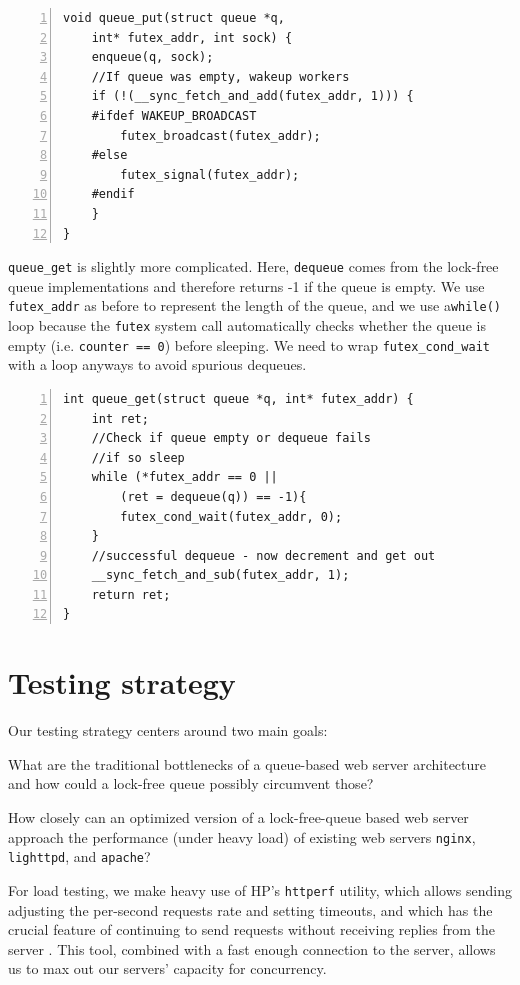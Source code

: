 \documentclass[twoside,10pt]{article}
\begin{document}
\begin{multicols}{2}
\begin{Verbatim}[numbers=left, fontsize=\small]
void queue_put(struct queue *q, 
    int* futex_addr, int sock) {
    enqueue(q, sock); 	
    //If queue was empty, wakeup workers 
    if (!(__sync_fetch_and_add(futex_addr, 1))) {
    #ifdef WAKEUP_BROADCAST
        futex_broadcast(futex_addr); 
    #else 
        futex_signal(futex_addr); 
    #endif 
    }
}
\end{Verbatim}

\verb+queue_get+ is slightly more complicated. Here, \verb+dequeue+
comes from the lock-free queue implementations and therefore returns -1 if the
queue is empty. We use \verb+futex_addr+ as before to represent the length of the queue, and we use a\verb+while()+ loop
because the \verb+futex+ system call automatically checks whether the
queue is empty (i.e.  \verb+counter == 0+) before sleeping. We need to
wrap \verb+futex_cond_wait+ with a loop anyways to avoid spurious dequeues.


\begin{Verbatim}[numbers=left,
                 fontsize=\small]
int queue_get(struct queue *q, int* futex_addr) {
    int ret;
    //Check if queue empty or dequeue fails
    //if so sleep  
    while (*futex_addr == 0 || 
        (ret = dequeue(q)) == -1){
        futex_cond_wait(futex_addr, 0);
    }
    //successful dequeue - now decrement and get out 
    __sync_fetch_and_sub(futex_addr, 1);
    return ret; 
}
\end{Verbatim}

\section{Testing strategy}

Our testing strategy centers around two main goals:

\begin{compactitem}
\item What are the traditional bottlenecks of a queue-based web server
  architecture and how could a lock-free queue possibly circumvent
  those?
\item How closely can an optimized version of a lock-free-queue based
  web server approach the performance (under heavy load) of existing
  web servers \verb+nginx+, \verb+lighttpd+, and \verb+apache+?
\end{compactitem}

For load testing, we make heavy use of HP's \verb+httperf+ utility,
which allows sending adjusting the per-second requests rate and
setting timeouts, and which has the crucial feature of continuing to
send requests without receiving replies from the server
\cite{mosberger1998httperf}. This tool, combined with a fast enough
connection to the server, allows us to max out our servers' capacity
for concurrency.


\end{multicols}
\end{document}
